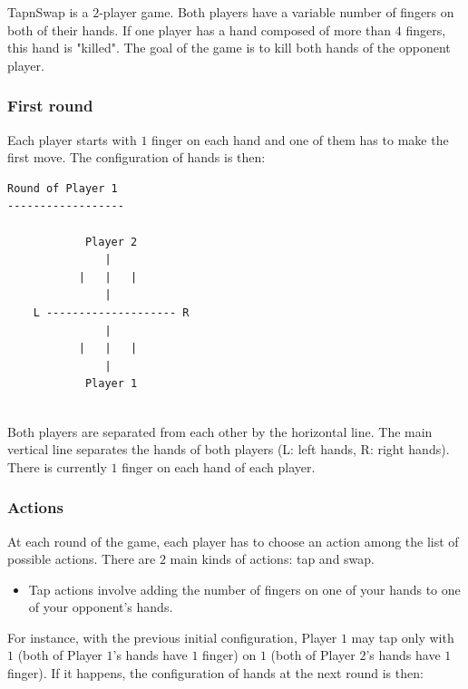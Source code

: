 \documentclass{article}
\begin{document}
TapnSwap is a $2$-player game. Both players have a variable number of fingers on both of their hands. If one player has a hand composed of more than $4$ fingers, this hand is "killed". The goal of the game is to kill both hands of the opponent player.

\subsubsection*{First round}


Each player starts with $1$ finger on each hand and one of them has to make the first move. The configuration of hands is then:

\begin{verbatim}
Round of Player 1
------------------

            Player 2                
               |                    
           |   |   |                
               |                    
    L -------------------- R        
               |                    
           |   |   |                
               |                    
            Player 1 
            
\end{verbatim}

Both players are separated from each other by the horizontal line. The main vertical line separates the hands of both players (L: left hands, R: right hands). There is currently $1$ finger on each hand of each player.

\subsubsection*{Actions}


At each round of the game, each player has to choose an action among the list of possible actions. There are $2$ main kinds of actions: tap and swap.


\begin{itemize}
    \item Tap actions involve adding the number of fingers on one of your hands to one of your opponent's hands.
\end{itemize}{}

For instance, with the previous initial configuration, Player $1$ may tap only with $1$ (both of Player $1$'s hands have $1$ finger) on $1$ (both of Player $2$'s hands have $1$ finger). If it happens, the configuration of hands at the next round is then:
\end{document}
